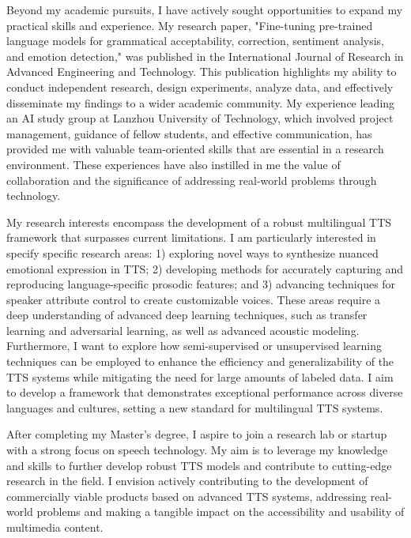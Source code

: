\documentclass[12pt,a4paper]{article}
\begin{document}
\begin{CJK*}{UTF8}{gbsn}
Beyond my academic pursuits, I have actively sought opportunities to expand my practical skills and experience. My research paper, "Fine-tuning pre-trained language models for grammatical acceptability, correction, sentiment analysis, and emotion detection," was published in the International Journal of Research in Advanced Engineering and Technology. This publication highlights my ability to conduct independent research, design experiments, analyze data, and effectively disseminate my findings to a wider academic community. My experience leading an AI study group at Lanzhou University of Technology, which involved project management, guidance of fellow students, and effective communication, has provided me with valuable team-oriented skills that are essential in a research environment. These experiences have also instilled in me the value of collaboration and the significance of addressing real-world problems through technology.\newline

My research interests encompass the development of a robust multilingual TTS framework that surpasses current limitations. I am particularly interested in specify specific research areas: 1) exploring novel ways to synthesize nuanced emotional expression in TTS; 2) developing methods for accurately capturing and reproducing language-specific prosodic features; and 3) advancing techniques for speaker attribute control to create customizable voices. These areas require a deep understanding of advanced deep learning techniques, such as transfer learning and adversarial learning, as well as advanced acoustic modeling. Furthermore, I want to explore how semi-supervised or unsupervised learning techniques can be employed to enhance the efficiency and generalizability of the TTS systems while mitigating the need for large amounts of labeled data. I aim to develop a framework that demonstrates exceptional performance across diverse languages and cultures, setting a new standard for multilingual TTS systems. \newline

After completing my Master's degree, I aspire to join a research lab or startup with a strong focus on speech technology. My aim is to leverage my knowledge and skills to further develop robust TTS models and contribute to cutting-edge research in the field. I envision actively contributing to the development of commercially viable products based on advanced TTS systems, addressing real-world problems and making a tangible impact on the accessibility and usability of multimedia content. \newline


\end{CJK*}
\end{document}

